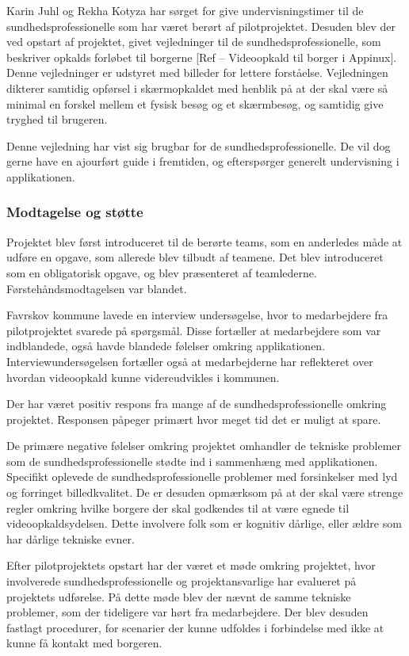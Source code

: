 Karin Juhl og Rekha Kotyza har sørget for give undervisningstimer til de sundhedsprofessionelle som har været berørt af pilotprojektet. Desuden blev der ved opstart af projektet, givet vejledninger til de sundhedsprofessionelle, som beskriver opkalds forløbet til borgerne [Ref – Videoopkald til borger i Appinux]. Denne vejledninger er udstyret med billeder for lettere forståelse. Vejledningen dikterer samtidig opførsel i skærmopkaldet med henblik på at der skal være så minimal en forskel mellem et fysisk besøg og et skærmbesøg, og samtidig give tryghed til brugeren.

Denne vejledning har vist sig brugbar for de sundhedsprofessionelle. De vil dog gerne have en ajourført guide i fremtiden, og efterspørger generelt undervisning i applikationen.

 
\subsubsection{Modtagelse og støtte}
Projektet blev først introduceret til de berørte teams, som en anderledes måde at udføre en opgave, som allerede blev tilbudt af teamene. Det blev introduceret som en obligatorisk opgave, og blev præsenteret af teamlederne. Førstehåndsmodtagelsen var blandet. 

Favrskov kommune lavede en interview undersøgelse, hvor to medarbejdere fra pilotprojektet svarede på spørgsmål. Disse fortæller at medarbejdere som var indblandede, også havde blandede følelser omkring applikationen. Interviewundersøgelsen fortæller også at medarbejderne har reflekteret over hvordan videoopkald kunne videreudvikles i kommunen. 

Der har været positiv respons fra mange af de sundhedsprofessionelle omkring projektet. Responsen påpeger primært hvor meget tid det er muligt at spare.

De primære negative følelser omkring projektet omhandler de tekniske problemer som de sundhedsprofessionelle stødte ind i sammenhæng med applikationen. Specifikt oplevede de sundhedsprofessionelle problemer med forsinkelser med lyd og forringet billedkvalitet. De er desuden opmærksom på at der skal være strenge regler omkring hvilke borgere der skal godkendes til at være egnede til videoopkaldsydelsen. Dette involvere folk som er kognitiv dårlige, eller ældre som har dårlige tekniske evner. 

Efter pilotprojektets opstart har der været et møde omkring projektet, hvor involverede sundhedsprofessionelle og projektansvarlige har evalueret på projektets udførelse. På dette møde blev der nævnt de samme tekniske problemer, som der tideligere var hørt fra medarbejdere. Der blev desuden fastlagt procedurer, for scenarier der kunne udfoldes i forbindelse med ikke at kunne få kontakt med borgeren. 

